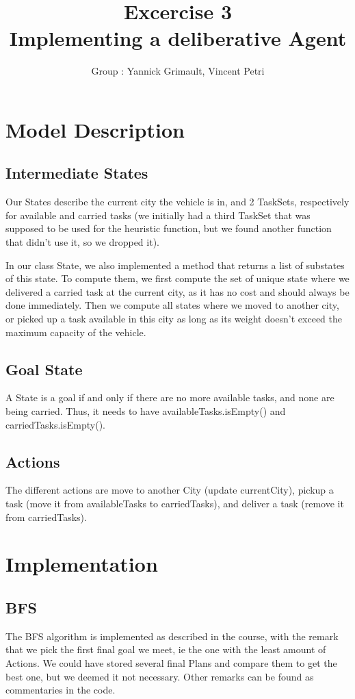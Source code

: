 \documentclass[11pt]{article}
\title{\bf Excercise 3\\ Implementing a deliberative Agent}
\author{Group \textnumero3 : Yannick Grimault, Vincent Petri}
\begin{document}
\maketitle

\section{Model Description}

\subsection{Intermediate States}
Our States describe the current city the vehicle is in, and 2 TaskSets, respectively for available and carried tasks (we initially had a third TaskSet that was supposed to be used for the heuristic function, but we found another function that didn't use it, so we dropped it).

In our class State, we also implemented a method that returns a list of substates of this state. To compute them, we first compute the set of unique state where we delivered a carried task at the current city, as it has no cost and should always be done immediately. Then we compute all states where we moved to another city, or picked up a task available in this city as long as its weight doesn't exceed the maximum capacity of the vehicle.

\subsection{Goal State}
A State is a goal if and only if there are no more available tasks, and none are being carried. Thus, it needs to have availableTasks.isEmpty() and carriedTasks.isEmpty().

\subsection{Actions}
The different actions are move to another City (update currentCity), pickup a task (move it from availableTasks to carriedTasks), and deliver a task (remove it from carriedTasks).


\section{Implementation}

\subsection{BFS}
The BFS algorithm is implemented as described in the course, with the remark that we pick the first final goal we meet, ie the one with the least amount of Actions. We could have stored several final Plans and compare them to get the best one, but we deemed it not necessary. Other remarks can be found as commentaries in the code.
\end{document}
